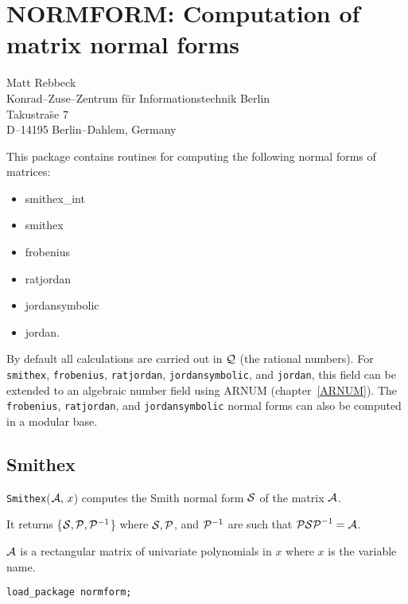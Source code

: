 \chapter[NORMFORM: matrix normal forms]%
        {NORMFORM: Computation of matrix normal forms}
\label{NORMFORM}

{\footnotesize
\begin{center}
Matt Rebbeck \\
Konrad--Zuse--Zentrum f\"ur Informationstechnik Berlin \\
Takustra\"se 7 \\
D--14195 Berlin--Dahlem, Germany \\[0.05in]
\end{center}
}

This package contains routines for computing the following
normal forms of matrices:
\begin{itemize}
\item smithex\_int
\item smithex
\item frobenius
\item ratjordan
\item jordansymbolic
\item jordan.
\end{itemize}

By default all calculations are carried out in ${\cal Q}$ (the rational
numbers). For {\tt smithex}, {\tt frobenius}, {\tt ratjordan},
{\tt jordansymbolic}, and {\tt jordan}, this field can be extended to
an algebraic number field using ARNUM (chapter~\ref{ARNUM}).
The {\tt frobenius}, {\tt ratjordan}, and {\tt jordansymbolic} normal
forms can also be computed in a modular base.

\section{Smithex}

{\tt Smithex}(${\cal A},\, x$) computes the Smith normal form ${\cal S}$
of the matrix ${\cal A}$.

It returns \{${\cal S}, {\cal P}, {\cal P}^{-1}$\} where ${\cal S},
{\cal P}$, and ${\cal P}^{-1}$ are such that
 ${\cal P S P}^{-1} = {\cal A}$.

 ${\cal A}$ is a rectangular matrix of univariate polynomials in $x$
where $x$ is the variable name.

{\tt load\_package normform;}

